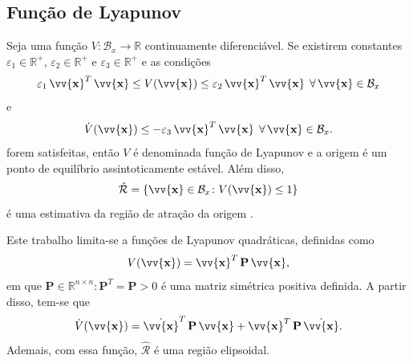 \documentclass{ppgeesa}
\newcommand*{\Prod}{\,}
\newcommand*{\Bold}[1]{\boldsymbol{\mathbf{#1}}}
\newcommand*{\Matr}[1]{\Bold{#1}}
\newcommand*{\Vect}[1]{\vv{\Bold{#1}}}
\newcommand*{\Transp}[1]{{#1}^{T}}
\newcommand*{\ForAll}{\:\:\forall\,}
\begin{document}
\subsection{Função de Lyapunov}
Seja uma função $V \colon \mathcal{B}_x \to \mathbb{R}$ continuamente diferenciável. Se existirem constantes $\varepsilon_1 \in \mathbb{R}^+$, $\varepsilon_2 \in \mathbb{R}^+$ e $\varepsilon_3 \in \mathbb{R}^+$ e as condições
\begin{equation}\label{eq:Lyapunov}
  \varepsilon_1 \Prod \Transp{\Vect{x}} \Prod \Vect{x} \leq V(\Vect{x}) \leq \varepsilon_2 \Prod \Transp{\Vect{x}} \Prod \Vect{x}
  \ForAll \Vect{x} \in \mathcal{B}_x
\end{equation}
e
\begin{equation}\label{eq:Lyapunov-diff}
  \dot{V}(\Vect{x}) \leq -\varepsilon_3 \Prod \Transp{\Vect{x}} \Prod \Vect{x}
  \ForAll \Vect{x} \in \mathcal{B}_x
  .
\end{equation}
forem satisfeitas, então $V$ é denominada função de Lyapunov e a origem é um ponto de equilíbrio assintoticamente estável.
Além disso,
\begin{equation}\label{eq:attraction-estimate}
  \hat{\mathcal{R}} = \left\{\Vect{x} \in \mathcal{B}_x \colon V(\Vect{x}) \leq 1\right\}
\end{equation}
é uma estimativa da região de atração da origem \cite{book:Khalil2002,article:Coutinho2010}.

Este trabalho limita-se a funções de Lyapunov quadráticas, definidas como
\begin{equation}\label{eq:Lyapunov-quadratic}
  V(\Vect{x})= \Transp{\Vect{x}} \Prod \Matr{P} \Prod \Vect{x}
  ,
\end{equation}
em que $\Matr{P} \in \mathbb{R}^{n \times n} \colon \Transp{\Matr{P}} = \Matr{P} > 0$ é uma matriz simétrica positiva definida.
A partir disso, tem-se que
\begin{equation}\label{eq:Lyapunov-quadratic-diff}
  \dot{V}(\Vect{x}) = \Transp{\dot{\Vect{x}}} \Prod \Matr{P} \Prod \Vect{x} + \Transp{\Vect{x}} \Prod \Matr{P} \Prod \dot{\Vect{x}}.
\end{equation}
Ademais, com essa função, $\hat{\mathcal{R}}$ é uma região elipsoidal.
\end{document}
